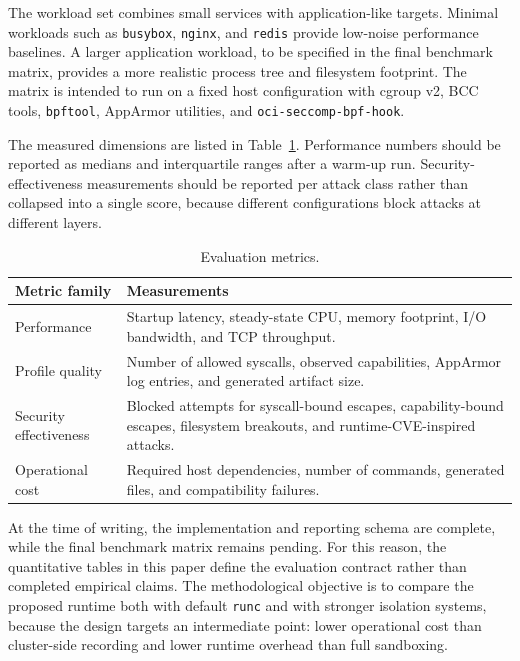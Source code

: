 \documentclass[runningheads]{llncs}
\begin{document}
The workload set combines small services with application-like targets. Minimal workloads such as \texttt{busybox}, \texttt{nginx}, and \texttt{redis} provide low-noise performance baselines. A larger application workload, to be specified in the final benchmark matrix, provides a more realistic process tree and filesystem footprint. The matrix is intended to run on a fixed host configuration with cgroup v2, BCC tools, \texttt{bpftool}, AppArmor utilities, and \texttt{oci-seccomp-bpf-hook}.

The measured dimensions are listed in Table~\ref{tab:metrics}. Performance numbers should be reported as medians and interquartile ranges after a warm-up run. Security-effectiveness measurements should be reported per attack class rather than collapsed into a single score, because different configurations block attacks at different layers.

\begin{table}
\caption{Evaluation metrics.}
\label{tab:metrics}
\centering
\begin{tabular}{p{3.2cm}p{8.0cm}}
\toprule
\textbf{Metric family} & \textbf{Measurements} \\
\midrule
Performance & Startup latency, steady-state CPU, memory footprint, I/O bandwidth, and TCP throughput. \\
Profile quality & Number of allowed syscalls, observed capabilities, AppArmor log entries, and generated artifact size. \\
Security effectiveness & Blocked attempts for syscall-bound escapes, capability-bound escapes, filesystem breakouts, and runtime-CVE-inspired attacks. \\
Operational cost & Required host dependencies, number of commands, generated files, and compatibility failures. \\
\bottomrule
\end{tabular}
\end{table}

At the time of writing, the implementation and reporting schema are complete, while the final benchmark matrix remains pending. For this reason, the quantitative tables in this paper define the evaluation contract rather than completed empirical claims. The methodological objective is to compare the proposed runtime both with default \texttt{runc} and with stronger isolation systems, because the design targets an intermediate point: lower operational cost than cluster-side recording and lower runtime overhead than full sandboxing.
\end{document}

